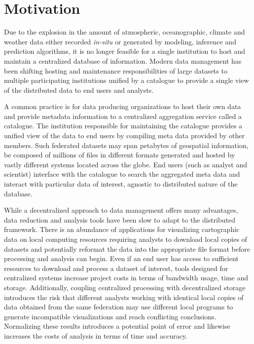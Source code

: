 \section{Motivation}
\label{sec:motivation}
Due to the explosion in the amount of atmospheric, oceanographic,
climate and weather data either recorded \emph{in-situ} or generated
by modeling, inference and prediction algorithms, it is no longer
feasible for a single institution to host and maintain a centralized
database of information. Modern data management has been shifting
hosting and maintenance responsibilities of large datasets to multiple
participating institutions unified by a catalogue to provide a single
view of the distributed data to end users and analysts.

A common practice is for data producing organizations to host their
own data and provide metadata information to a centralized aggregation
service called a catalogue. The institution responsible for
maintaining the catalogue provides a unified view of the data to end
users by compiling meta data provided by other members. Such federated
datasets may span petabytes of geospatial information, be composed of
millions of files in different formats generated and hosted by vastly
different systems located across the globe. End users (such as analyst
and scientist) interface with the catalogue to search the aggregated
meta data and interact with particular data of interest, agnostic to
distributed nature of the database.

While a decentralized approach to data management offers many
advantages, data reduction and analysis tools have been slow to adapt
to the distributed framework. There is an abundance of applications
for visualizing cartographic data on local computing resources
requiring analysts to download local copies of datasets and
potentially reformat the data into the appropriate file format before
processing and analysis can begin. Even if an end user has access to
sufficient resources to download and process a dataset of interest,
tools designed for centralized systems increase project costs in
terms of bandwidth usage, time and storage. Additionally, coupling
centralized processing with decentralized storage introduces the risk that
different analysts working with identical local copies of data
obtained from the same federation may use different local programs to
generate incompatible visualizations and reach conflicting
conclusions. Normalizing these results introduces a potential point of
error and likewise increases the costs of analysis in terms of time
and accuracy.

